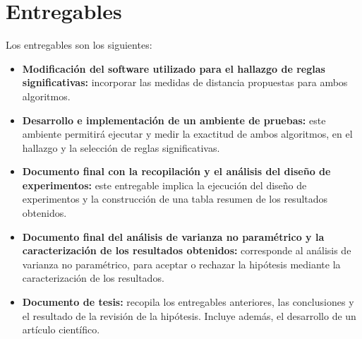 \section{\textbf{Entregables}}
Los entregables son los siguientes:
\begin{itemize}
\item \textbf{Modificaci\'on del software utilizado para el hallazgo de reglas significativas:} incorporar las medidas de distancia propuestas para ambos algoritmos.
\item \textbf{Desarrollo e implementaci\'on de un ambiente de pruebas:} este ambiente permitir\'a ejecutar y medir la exactitud de ambos algoritmos, en el hallazgo y la selecci\'on de reglas significativas.
\item \textbf{Documento final con la recopilaci\'on y el an\'alisis del dise\~no de experimentos:} este entregable implica la ejecuci\'on del dise\~no de experimentos y la construcci\'on de una tabla resumen de los resultados obtenidos. 
\item \textbf{Documento final del an\'alisis de varianza no param\'etrico y la caracterizaci\'on de los resultados obtenidos:} corresponde al an\'alisis de varianza no param\'etrico, para aceptar o rechazar la hip\'otesis mediante la caracterizaci\'on de los resultados.
\item \textbf{Documento de tesis:} recopila los entregables anteriores, las conclusiones y el resultado de la revisi\'on de la hip\'otesis. Incluye adem\'as, el desarrollo de un art\'iculo cient\'ifico.
\end{itemize}